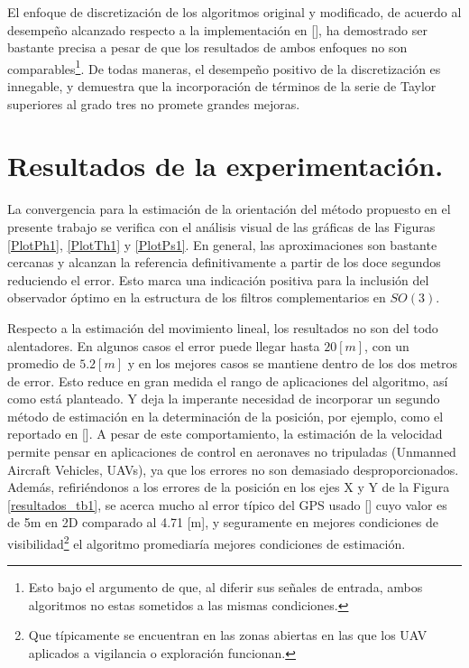 \documentclass[10pt]{report}
\numberwithin{equation}{chapter}
\numberwithin{algorithm}{chapter}
\newcommand{\bcite}[1]{[\cite{#1}]}
\begin{document}
El enfoque de discretización de los algoritmos original y modificado, de acuerdo al desempeño alcanzado respecto a la implementación en \bcite{Mahony2008}, ha demostrado ser bastante precisa a pesar de que los resultados de ambos enfoques no son comparables\footnote{Esto bajo el argumento de que, al diferir sus señales de entrada, ambos algoritmos no estas sometidos a las mismas condiciones.}.
De todas maneras, el desempeño positivo de la discretización es innegable, y demuestra que la incorporación de términos de la serie de Taylor superiores al grado tres no promete grandes mejoras.\par
\section{Resultados de la experimentación.} %
La convergencia para la estimación de la orientación del método propuesto en el presente trabajo se verifica con el análisis visual de las gráficas de las Figuras \ref{PlotPh1}, \ref{PlotTh1} y \ref{PlotPs1}. En general, las aproximaciones son bastante cercanas y alcanzan la referencia definitivamente a partir de los doce segundos reduciendo el error. Esto marca una indicación positiva para la inclusión del observador óptimo en la estructura de los filtros complementarios en $SO(3)$.\par
Respecto a la estimación del movimiento lineal, los resultados no son del todo alentadores. En algunos casos el error puede llegar hasta $20[m]$, con un promedio de $5.2[m]$ y en los mejores casos se mantiene dentro de los dos metros de error. Esto reduce en gran medida el rango de aplicaciones del algoritmo, así como está planteado. Y deja la imperante necesidad de incorporar un segundo método de estimación en la determinación de la posición, por ejemplo, como el reportado en \bcite{Merwe2004}. A pesar de este comportamiento, la estimación de la velocidad permite pensar en aplicaciones de control en aeronaves no tripuladas (Unmanned Aircraft Vehicles, UAVs), ya que los errores no son demasiado desproporcionados. Además, refiriéndonos a los errores de la posición en los ejes X y Y de la Figura \ref{resultados_tb1}, se acerca mucho al error típico del GPS usado \bcite{Mediatek2009} cuyo valor es de 5m en 2D comparado al 4.71 [m], y seguramente en mejores condiciones de visibilidad\footnote{Que típicamente se encuentran en las zonas abiertas en las que los UAV aplicados a vigilancia o exploración funcionan.} el algoritmo promediaría mejores condiciones de estimación.\par
\end{document}
